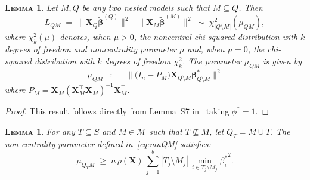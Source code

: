 \documentclass[
  12pt]{article}
\newcommand{\M}{\mathcal{M}}
\newcommand{\bbeta}{\boldsymbol{\beta}}
\newcommand{\bX}{\mathbf{X}}
\newtheorem{lem}[thm]{\textsc{Lemma}}
\begin{document}
\begin{lem}\label{lemma:s7}
    Let $M,Q$ be any two nested models such that $M \subseteq Q$. Then
$$
L_{QM}\;=\;\|\bX_{Q}\tilde{\bbeta}^{(Q)}\|^2-\|\bX_{M}\tilde{\bbeta}^{(M)}\|^2\;\sim\; \chi_{|Q\setminus M|}^2\left(\mu_{Q M}\right), 
$$
where $\chi_{k}^2(\mu)$ denotes, when $\mu>0$, the noncentral chi-squared distribution with $k$ degrees of freedom and noncentrality parameter $\mu$ and, when $\mu=0$, the chi-squared distribution with $k$ degrees of freedom $\chi_{k}^2$. The parameter $\mu_{QM}$ is given by \begin{equation}\label{eq:muQM}
    \mu_{QM}\;\;:=\;\;\|\big(I_n-P_M\big) \bX_{Q\setminus M} \bbeta^*_{Q\setminus M}\|^2
\end{equation}
where $P_M=\bX_{M}\left(\bX_{M}^{\top} \bX_{M}\right)^{-1} \bX_{M}^{\top}$.
\end{lem}
\begin{proof}
    This result follows directly from Lemma~S7 in~\cite{rossell2022concentration} taking $\phi^*=1$.
\end{proof}

\begin{lem}\label{lem:boundrhogen}
 For any $T\subseteq S$ and $M\in\M$ such that $T\not\subseteq M$, let $Q_T=M \cup T$. The non-centrality parameter defined in~\eqref{eq:muQM} satisfies: 
\begin{equation}
    \mu_{Q_TM}\; \geq \;n\,\rho(\bX)\,\sum_{j=1}^b|T_j\setminus M_j|\,\min_{i\in T_j\setminus M_j}{\beta_{i}^*}^2.
\end{equation}
\end{lem}
\end{document}
